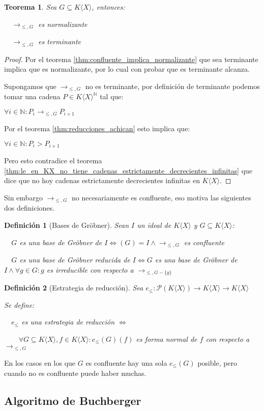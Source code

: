 \documentclass{amsbook}
\theoremstyle{customstyle}
\newtheorem{definition}{Definición}[section]
\newtheorem{theorem}{Teorema}[section]
\begin{document}
\begin{theorem}
Sea $G ⊆ K⟨X⟩$, entonces:

  $→_{≤, G}$ es normalizante

  $→_{≤, G}$ es terminante
\end{theorem}
\begin{proof}
Por el teorema \ref{thm:confluente_implica_normalizante} que sea terminante implica que es normalizante, por lo cual con probar que es terminante alcanza.

Supongamos que $→_{≤, G}$ no es terminante, por definición de terminante podemos tomar una cadena $P ∈ K⟨X⟩^ℕ$ tal que:

$∀i ∈ ℕ : P_i →_{≤, G} P_{i+1}$

Por el teorema \ref{thm:reducciones_achican} esto implica que:

$∀i ∈ ℕ : P_i > P_{i+1}$

Pero esto contradice el teorema \ref{thm:le_en_KX_no_tiene_cadenas_estrictamente_decrecientes_infinitas} que dice que no hoy cadenas estrictamente decrecientes infinitas en $K⟨X⟩$.

\end{proof}

Sin embargo $→_{≤, G}$ no necesariamente es confluente, eso motiva las siguientes dos definiciones.

\begin{definition}[Bases de Gröbner]
Sean $I$ un ideal de $K⟨X⟩$ y $G ⊆ K⟨X⟩$:

  $G$ es una base de Gröbner de $I ⇔ (G) = I ∧ →_{≤, G}$ es confluente

  $G$ es una base de Gröbner reducida de $I ⇔ G$ es una base de Gröbner de $I ∧ ∀g ∈ G : g$ es irreducible con respecto a $→_{≤, G - \{g\}}$

\end{definition}

\begin{definition}[Estrategia de reducción]
Sea $e_≤ : 𝒫(K⟨X⟩) → K⟨X⟩ → K⟨X⟩$

Se define:

  $e_≤$ es una estrategia de reducción $⇔$

    $∀G ⊆ K⟨X⟩, f ∈ K⟨X⟩ : e_≤(G)(f)$ es forma normal de $f$ con respecto a $→_{≤, G}$
\end{definition}

En los casos en los que $G$ es confluente hay una sola $e_≤(G)$ posible, pero cuando no es confluente puede haber muchas.


\subsection{Algoritmo de Buchberger}
\end{document}
